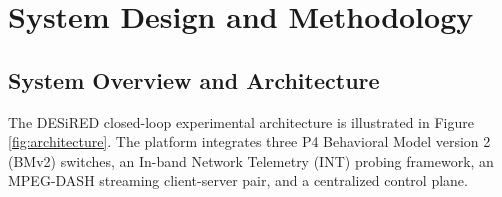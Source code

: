\documentclass[12pt,a4paper,oneside]{report}
\begin{document}
\chapter{System Design and Methodology}
\label{ch:design}

\section{System Overview and Architecture}
The DESiRED closed-loop experimental architecture is illustrated in Figure \ref{fig:architecture}. The platform integrates three P4 Behavioral Model version 2 (BMv2) switches, an In-band Network Telemetry (INT) probing framework, an MPEG-DASH streaming client-server pair, and a centralized control plane.
\end{document}

